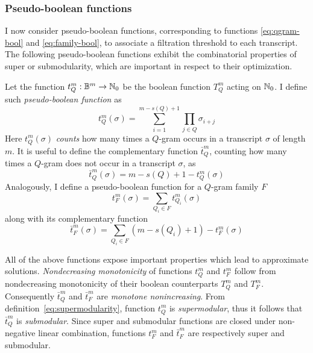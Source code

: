 \subsubsection{Pseudo-boolean functions}

I now consider pseudo-boolean functions, corresponding to functions \ref{eq:qgram-bool} and \ref{eq:family-bool}, to associate a filtration threshold to each transcript.
The following pseudo-boolean functions exhibit the combinatorial properties of super or submodularity, which are important in respect to their optimization.

Let the function $t_{Q}^{m}: \mathbb {B}^m \rightarrow \mathbb {N}_0$ be the boolean function $T_{Q}^{m}$ acting on $\mathbb {N}_0$.
I define such \emph{pseudo-boolean function} as
\begin{equation}
\label{eq:qgram-pseudo}
t_{Q}^{m}(\sigma) = \sum_{i=1}^{m-s(Q)+1} \prod_{j \in Q}\sigma_{i+j}
\end{equation}
Here $t_{Q}^{m}(\sigma)$ \emph{counts} how many times a $Q$-gram occurs in a transcript $\sigma$ of length $m$.
It is useful to define the complementary function $\bar{t}_{Q}^{m}$, counting how many times a $Q$-gram does not occur in a transcript $\sigma$, as
\begin{equation}
\label{eq:qgram-pseudoneg}
\bar{t}_{Q}^{m}(\sigma) = m - s(Q) + 1 - t_{Q}^{m}(\sigma)
\end{equation}
Analogously, I define a pseudo-boolean function for a $Q$-gram family $F$
\begin{equation}
\label{eq:family-pseudo}
t_{F}^{m}(\sigma) = \sum_{Q_i \in F} t_{Q_i}^{m}(\sigma)
\end{equation}
along with its complementary function
\begin{equation}
\label{eq:family-pseudoneg}
\bar{t}_{F}^{m}(\sigma) = \sum_{Q_i \in F}{(m - s(Q_i) + 1)} - t_{F}^{m}(\sigma)
\end{equation}

All of the above functions expose important properties which lead to approximate solutions.
\emph{Nondecreasing monotonicity} of functions $t_{Q}^{m}$ and $t_{F}^{m}$ follow from nondecreasing monotonicity of their boolean counterparts $T_{Q}^{m}$ and $T_{F}^{m}$. Consequently $\bar{t}_{Q}^{m}$ and $\bar{t}_{F}^{m}$ are \emph{monotone nonincreasing}.
From definition~\ref{eq:supermodularity}, function $t_{Q}^{m}$ is \emph{supermodular}, thus it follows that $\bar{t}_{Q}^{m}$ is \emph{submodular}.
Since super and submodular functions are closed under non-negative linear combination, functions $t_{F}^{m}$ and $\bar{t}_{F}^{m}$ are respectively super and submodular.

